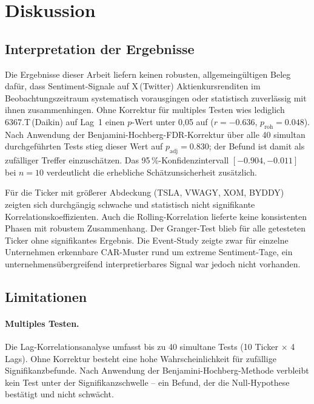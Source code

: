 \section{Diskussion}
\label{sec:diskussion}

\subsection{Interpretation der Ergebnisse}

Die Ergebnisse dieser Arbeit liefern keinen robusten, allgemeingültigen Beleg dafür, dass Sentiment-Signale auf X\,(Twitter) Aktienkursrenditen im Beobachtungszeitraum systematisch vorausgingen oder statistisch zuverlässig mit ihnen zusammenhingen. Ohne Korrektur für multiples Testen wies lediglich 6367.T\,(Daikin) auf Lag~1 einen $p$-Wert unter 0,05 auf ($r = -0.636$, $p_{\mathrm{roh}} = 0.048$). Nach Anwendung der Benjamini-Hochberg-FDR-Korrektur \autocite{benjamini1995controlling} über alle 40 simultan durchgeführten Tests stieg dieser Wert auf $p_{\mathrm{adj}} = 0.830$; der Befund ist damit als zufälliger Treffer einzuschätzen. Das 95\,\%-Konfidenzintervall $[-0.904, -0.011]$ bei $n = 10$ verdeutlicht die erhebliche Schätzunsicherheit zusätzlich.

Für die Ticker mit größerer Abdeckung (TSLA, VWAGY, XOM, BYDDY) zeigten sich durchgängig schwache und statistisch nicht signifikante Korrelationskoeffizienten. Auch die Rolling-Korrelation lieferte keine konsistenten Phasen mit robustem Zusammenhang. Der Granger-Test blieb für alle getesteten Ticker ohne signifikantes Ergebnis. Die Event-Study zeigte zwar für einzelne Unternehmen erkennbare CAR-Muster rund um extreme Sentiment-Tage, ein unternehmensübergreifend interpretierbares Signal war jedoch nicht vorhanden.

\subsection{Limitationen}

\paragraph{Multiples Testen.}
Die Lag-Korrelationsanalyse umfasst bis zu 40 simultane Tests (10 Ticker $\times$ 4 Lags). Ohne Korrektur besteht eine hohe Wahrscheinlichkeit für zufällige Signifikanzbefunde. Nach Anwendung der Benjamini-Hochberg-Methode \autocite{benjamini1995controlling} verbleibt kein Test unter der Signifikanzschwelle -- ein Befund, der die Null-Hypothese bestätigt und nicht schwächt.

